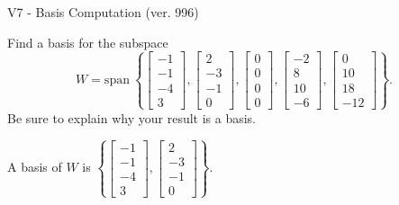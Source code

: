 \begin{exercise}
  \begin{exerciseTitle}V7 - Basis Computation (ver. 996)\end{exerciseTitle}
  \begin{exerciseStatement}
    Find a basis for the subspace 
\[W=\mathrm{span}\ \left\{\left[\begin{array}{r}
-1 \\
-1 \\
-4 \\
3
\end{array}\right] , \left[\begin{array}{r}
2 \\
-3 \\
-1 \\
0
\end{array}\right] , \left[\begin{array}{r}
0 \\
0 \\
0 \\
0
\end{array}\right] , \left[\begin{array}{r}
-2 \\
8 \\
10 \\
-6
\end{array}\right] , \left[\begin{array}{r}
0 \\
10 \\
18 \\
-12
\end{array}\right]\right\}.\]
 Be sure to explain why your result is a basis.


  \end{exerciseStatement}
  \begin{exerciseAnswer}
   A basis of \(W\) is  \(\left\{\left[\begin{array}{r}
-1 \\
-1 \\
-4 \\
3
\end{array}\right] , \left[\begin{array}{r}
2 \\
-3 \\
-1 \\
0
\end{array}\right]\right\}\).
  


  \end{exerciseAnswer}
\end{exercise}